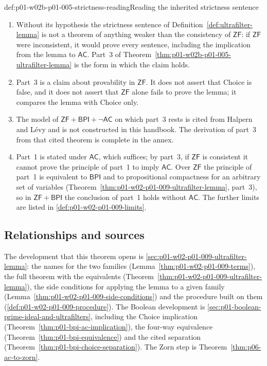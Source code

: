 \begin{hbwarning}{def:p01-w02b-p01-005-strictness-reading}{Reading the inherited strictness sentence}
\begin{enumerate}
  \item Without its hypothesis the strictness sentence of
    Definition~\ref{def:ultrafilter-lemma} is not a theorem of anything
    weaker than the consistency of \(\mathsf{ZF}\): if \(\mathsf{ZF}\) were
    inconsistent, it would prove every sentence, including the implication
    from the lemma to \(\mathsf{AC}\). Part~3 of
    Theorem~\ref{thm:p01-w02b-p01-005-ultrafilter-lemma} is the form in which
    the claim holds.
  \item Part~3 is a claim about provability in \(\mathsf{ZF}\). It does not
    assert that Choice is false, and it does not assert that \(\mathsf{ZF}\)
    alone fails to prove the lemma; it compares the lemma with Choice only.
  \item The model of \(\mathsf{ZF}+\mathsf{BPI}+\neg\mathsf{AC}\) on which
    part~3 rests is cited from Halpern and L\'evy \cite{HalpernLevy1971} and
    is not constructed in this handbook. The derivation of part~3 from that
    cited theorem is complete in the annex.
  \item Part~1 is stated under \(\mathsf{AC}\), which suffices; by part~3, if
    \(\mathsf{ZF}\) is consistent it cannot prove the principle of part~1
    to imply \(\mathsf{AC}\). Over \(\mathsf{ZF}\) the principle of part~1
    is equivalent to \(\mathsf{BPI}\) and to propositional compactness for an
    arbitrary set of variables
    (Theorem~\ref{thm:p01-w02-p01-009-ultrafilter-lemma}, part~3), so in
    \(\mathsf{ZF}+\mathsf{BPI}\) the conclusion of part~1 holds without
    \(\mathsf{AC}\). The further limits are listed in
    \cref{def:p01-w02-p01-009-limits}.
\end{enumerate}
\end{hbwarning}

\subsection{Relationships and sources}
\label{sec:p01-w02b-p01-005-relationships}

The development that this theorem opens is
\cref{sec:p01-w02-p01-009-ultrafilter-lemma}: the names for the two families
(Lemma~\ref{thm:p01-w02-p01-009-terms}), the full theorem with the
equivalents (Theorem~\ref{thm:p01-w02-p01-009-ultrafilter-lemma}), the side
conditions for applying the lemma to a given family
(Lemma~\ref{thm:p01-w02-p01-009-side-conditions}) and the procedure built on
them (\cref{def:p01-w02-p01-009-procedure}). The Boolean development is
\cref{sec:p01-boolean-prime-ideal-and-ultrafilters}, including the Choice
implication (Theorem~\ref{thm:p01-bpi-ac-implication}), the four-way
equivalence (Theorem~\ref{thm:p01-bpi-equivalence}) and the cited separation
(Theorem~\ref{thm:p01-bpi-choice-separation}). The Zorn step is
Theorem~\ref{thm:p06-ac-to-zorn}.

